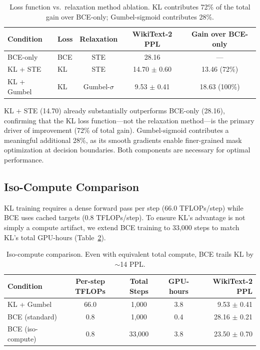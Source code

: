 \documentclass[11pt]{article}
\begin{document}
\begin{table}[t]
\centering
\caption{Loss function vs.\ relaxation method ablation. KL contributes 72\% of the total gain over BCE-only; Gumbel-sigmoid contributes 28\%.}
\label{tab:ste}
\small
\begin{tabular}{llccc}
\toprule
Condition & Loss & Relaxation & WikiText-2 PPL & Gain over BCE-only \\
\midrule
BCE-only & BCE & STE & 28.16 & --- \\
KL + STE & KL & STE & 14.70 $\pm$ 0.60 & 13.46 (72\%) \\
KL + Gumbel & KL & Gumbel-$\sigma$ & 9.53 $\pm$ 0.41 & 18.63 (100\%) \\
\bottomrule
\end{tabular}
\end{table}

KL + STE (14.70) already substantially outperforms BCE-only (28.16), confirming that the KL loss function---not the relaxation method---is the primary driver of improvement (72\% of total gain). Gumbel-sigmoid contributes a meaningful additional 28\%, as its smooth gradients enable finer-grained mask optimization at decision boundaries. Both components are necessary for optimal performance.

\subsection{Iso-Compute Comparison}
\label{sec:isocompute}

KL training requires a dense forward pass per step (66.0 TFLOPs/step) while BCE uses cached targets (0.8 TFLOPs/step). To ensure KL's advantage is not simply a compute artifact, we extend BCE training to 33{,}000 steps to match KL's total GPU-hours (Table~\ref{tab:isocompute}).

\begin{table}[t]
\centering
\caption{Iso-compute comparison. Even with equivalent total compute, BCE trails KL by ${\sim}$14 PPL.}
\label{tab:isocompute}
\small
\begin{tabular}{lcccr}
\toprule
Condition & Per-step TFLOPs & Total Steps & GPU-hours & WikiText-2 PPL \\
\midrule
KL + Gumbel & 66.0 & 1{,}000 & 3.8 & 9.53 $\pm$ 0.41 \\
BCE (standard) & 0.8 & 1{,}000 & 0.4 & 28.16 $\pm$ 0.21 \\
BCE (iso-compute) & 0.8 & 33{,}000 & 3.8 & 23.50 $\pm$ 0.70 \\
\bottomrule
\end{tabular}
\end{table}
\end{document}
